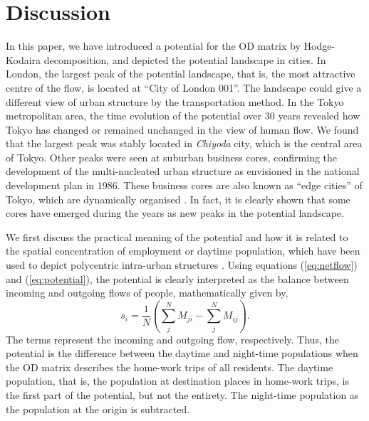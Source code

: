 \documentclass[]{article}
\begin{document}
%

%
%
%
%


\section*{Discussion}
\label{sec:discussion}
In this paper, we have introduced a potential for the OD matrix by  Hodge-Kodaira decomposition,
and depicted the potential landscape in cities.
In London, the largest peak of the potential landscape, that is, the most attractive centre of the flow, is located at  ``City of London 001''.
The landscape could give a different view of urban structure by the transportation method.
In the Tokyo metropolitan area, the time evolution of the potential over 30 years revealed how Tokyo has changed or remained unchanged in the view of human flow.
We found that the largest peak was stably located in \textit{Chiyoda} city, which is the central area of Tokyo.
Other peaks were seen at suburban business cores,
confirming the development of the multi-nucleated urban structure as envisioned in the national development plan in 1986.
These business cores are also known as ``edge cities'' of Tokyo, which are dynamically organised \cite{Garreau1991, Li2018, fujita1982multiple}.
In fact, it is clearly shown that some cores have emerged during the years as new peaks in the potential landscape.

We first discuss the practical meaning of the potential and how it is related to the spatial concentration of employment or daytime population, which have been used to depict polycentric intra-urban structures \cite{van2016pacifying, barthelemy2016structure}.
Using equations (\ref{eq:netflow}) and (\ref{eq:potential}), the potential is clearly interpreted as the balance between incoming and outgoing flows of people, mathematically given by,
\begin{equation}
  s_i =  \frac{1}{N} \left( \sum_j^N M_{ji} - \sum_j^N M_{ij} \right).
\end{equation}
The terms represent the incoming and outgoing flow, respectively.
Thus, the potential is the difference between the daytime and  night-time populations when the OD matrix describes the home-work trips of all residents.
The daytime population, that is, the population at destination places in home-work trips, is the first part of the potential, but not the entirety. The night-time population as the population at the origin is subtracted. 
\end{document}

